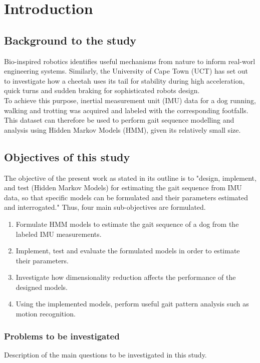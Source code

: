 \chapter{Introduction}

\section{Background to the study}
Bio-inspired robotics identifies useful mechanisms from nature to inform real-worl engineering systems. Similarly, the University of Cape Town (UCT) has set out to investigate how a cheetah uses its tail for stability during high acceleration, quick turns and sudden braking for sophisticated robots design. \\
To achieve this purpose, inertial measurement unit (IMU) data for a dog running, walking and trotting was acquired and labeled with the corresponding footfalls.\\
This dataset can therefore be used to perform gait sequence modelling and analysis using Hidden Markov Models (HMM), given its relatively small size. 						

\section{Objectives of this study}
The objective of the present work as stated in its outline is to "design, implement, and test (Hidden Markov Models) for estimating the gait sequence
from IMU data, so that specific models can be formulated and their
parameters estimated and interrogated." Thus, four main sub-objectives are formulated.
\begin{enumerate}
	\item Formulate HMM models to estimate the gait sequence of a dog from the labeled IMU measurements.
	\item Implement, test and evaluate the formulated models in order to estimate their parameters.
	\item Investigate how dimensionality reduction affects the performance of the designed models.
	\item Using the implemented models, perform useful gait pattern analysis such as motion recognition.
\end{enumerate}


\subsection{Problems to be investigated}
Description of the main questions to be investigated in this study.

